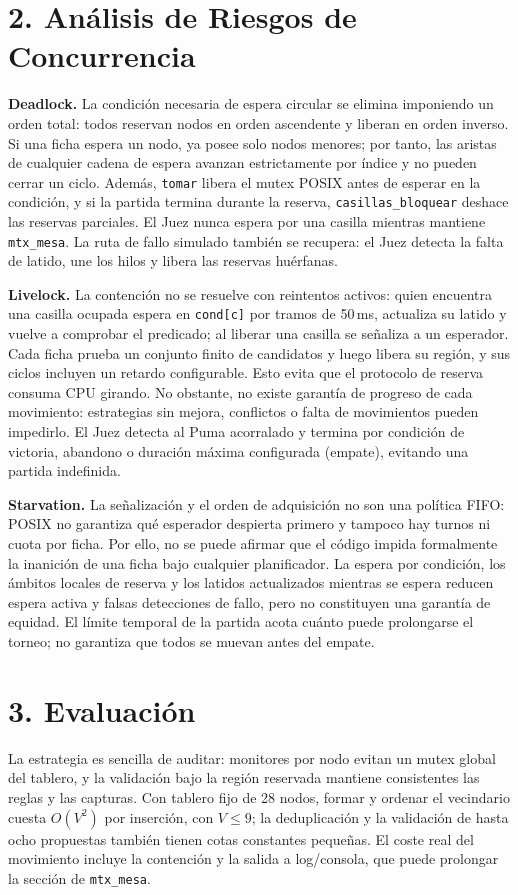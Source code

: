 \documentclass[10pt]{article}
\begin{document}
\section*{2. Análisis de Riesgos de Concurrencia}
\textbf{Deadlock.} La condición necesaria de espera circular se elimina
imponiendo un orden total: todos reservan nodos en orden ascendente y liberan
en orden inverso. Si una ficha espera un nodo, ya posee solo nodos menores;
por tanto, las aristas de cualquier cadena de espera avanzan estrictamente
por índice y no pueden cerrar un ciclo. Además, \texttt{tomar} libera el
mutex POSIX antes de esperar en la condición, y si la partida termina durante
la reserva, \texttt{casillas\_bloquear} deshace las reservas parciales.
El Juez nunca espera por una casilla mientras mantiene \texttt{mtx\_mesa}.
La ruta de fallo simulado también se recupera: el Juez detecta la falta de
latido, une los hilos y libera las reservas huérfanas.

\textbf{Livelock.} La contención no se resuelve con reintentos activos:
quien encuentra una casilla ocupada espera en \texttt{cond[c]} por tramos de
50\,ms, actualiza su latido y vuelve a comprobar el predicado; al liberar una
casilla se señaliza a un esperador. Cada ficha prueba un conjunto finito de
candidatos y luego libera su región, y sus ciclos incluyen un retardo
configurable. Esto evita que el protocolo de reserva consuma CPU girando.
No obstante, no existe garantía de progreso de cada movimiento: estrategias
sin mejora, conflictos o falta de movimientos pueden impedirlo. El Juez
detecta al Puma acorralado y termina por condición de victoria, abandono o
duración máxima configurada (empate), evitando una partida indefinida.

\textbf{Starvation.} La señalización y el orden de adquisición no son una
política FIFO: POSIX no garantiza qué esperador despierta primero y tampoco
hay turnos ni cuota por ficha. Por ello, no se puede afirmar que el código
impida formalmente la inanición de una ficha bajo cualquier planificador.
La espera por condición, los ámbitos locales de reserva y los latidos
actualizados mientras se espera reducen espera activa y falsas detecciones de
fallo, pero no constituyen una garantía de equidad. El límite temporal de la
partida acota cuánto puede prolongarse el torneo; no garantiza que todos se
muevan antes del empate.

\section*{3. Evaluación}
La estrategia es sencilla de auditar: monitores por nodo evitan un mutex
global del tablero, y la validación bajo la región reservada mantiene
consistentes las reglas y las capturas. Con tablero fijo de 28 nodos, formar y
ordenar el vecindario cuesta $O(V^2)$ por inserción, con $V\leq 9$; la
deduplicación y la validación de hasta ocho propuestas también tienen cotas
constantes pequeñas. El coste real del movimiento incluye la contención y la
salida a log/consola, que puede prolongar la sección de \texttt{mtx\_mesa}.
\end{document}
